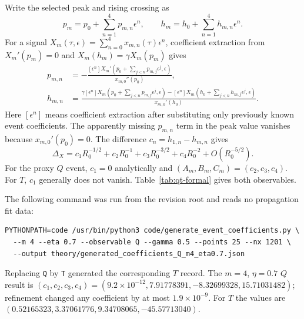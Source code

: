 \documentclass[11pt,a4paper]{article}
\begin{document}
Write the selected peak and rising crossing as
\begin{equation}
p_m=p_0+\sum_{n=1}^4p_{m,n}\epsilon^n,\qquad
h_m=h_0+\sum_{n=1}^4h_{m,n}\epsilon^n.
\end{equation}
For a signal $X_m(\tau,\epsilon)=\sum_{n=0}^4x_{m,n}(\tau)\epsilon^n$,
coefficient extraction from $X_m'(p_m)=0$ and
$X_m(h_m)=\gamma X_m(p_m)$ gives
\begin{align}
p_{m,n}&=-\frac{[\epsilon^n]X_m'
(p_0+\sum_{j<n}p_{m,j}\epsilon^j,\epsilon)}{x_{m,0}''(p_0)},\\
h_{m,n}&=\frac{\gamma[\epsilon^n]X_m
(p_0+\sum_{j<n}p_{m,j}\epsilon^j,\epsilon)
-[\epsilon^n]X_m
(h_0+\sum_{j<n}h_{m,j}\epsilon^j,\epsilon)}{x_{m,0}'(h_0)}.
\label{eq:event-recursion}
\end{align}
Here $[\epsilon^n]$ means coefficient extraction after substituting only
previously known event coefficients. The apparently missing $p_{m,n}$ term
in the peak value vanishes because $x_{m,0}'(p_0)=0$. The difference
$c_n=h_{1,n}-h_{m,n}$ gives
\begin{equation}
\Delta_X=c_1R_0^{-1/2}+c_2R_0^{-1}+c_3R_0^{-3/2}
+c_4R_0^{-2}+O(R_0^{-5/2}).
\end{equation}
For the proxy $Q$ event, $c_1=0$ analytically and
$(A_m,B_m,C_m)=(c_2,c_3,c_4)$. For $T$, $c_1$ generally does not vanish.
Table~\ref{tab:qt-formal} gives both observables.

The following command was run from the revision root and reads no
propagation fit data:
\begin{verbatim}
PYTHONPATH=code /usr/bin/python3 code/generate_event_coefficients.py \
  --m 4 --eta 0.7 --observable Q --gamma 0.5 --points 25 --nx 1201 \
  --output theory/generated_coefficients_Q_m4_eta0.7.json
\end{verbatim}
Replacing \texttt{Q} by \texttt{T} generated the corresponding $T$ record.
The $m=4$, $\eta=0.7$ $Q$ result is
$(c_1,c_2,c_3,c_4)=(9.2\times10^{-12},7.91778391,-8.32699328,
15.71031482)$; refinement changed any coefficient by at most
$1.9\times10^{-9}$. For $T$ the values are
$(0.52165323,3.37061776,9.34708065,-45.57713040)$.


\end{document}
